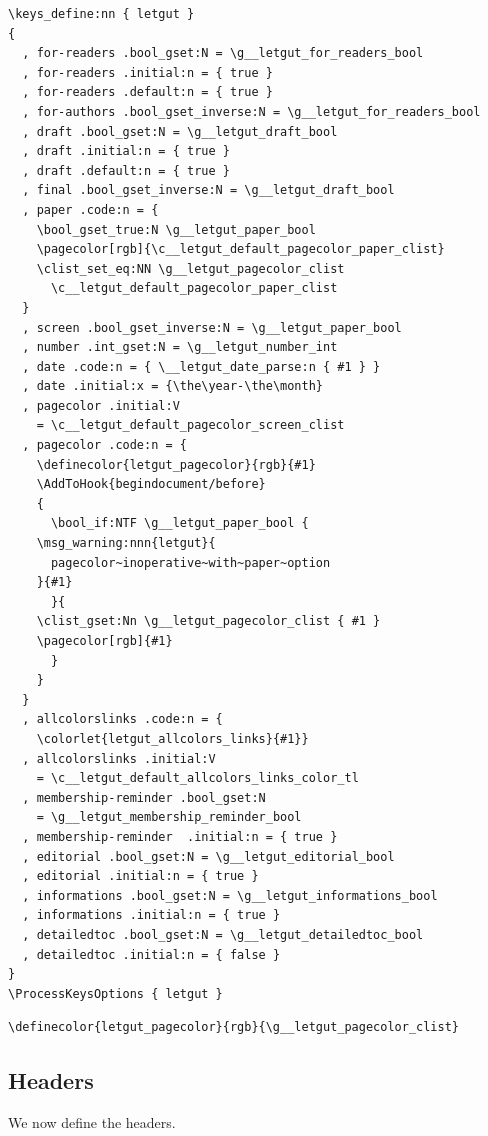 \documentclass{letgut}
\begin{document}
\begin{lstlisting}
\keys_define:nn { letgut }
{
  , for-readers .bool_gset:N = \g__letgut_for_readers_bool
  , for-readers .initial:n = { true }
  , for-readers .default:n = { true }
  , for-authors .bool_gset_inverse:N = \g__letgut_for_readers_bool
  , draft .bool_gset:N = \g__letgut_draft_bool
  , draft .initial:n = { true }
  , draft .default:n = { true }
  , final .bool_gset_inverse:N = \g__letgut_draft_bool
  , paper .code:n = {
    \bool_gset_true:N \g__letgut_paper_bool
    \pagecolor[rgb]{\c__letgut_default_pagecolor_paper_clist}
    \clist_set_eq:NN \g__letgut_pagecolor_clist
      \c__letgut_default_pagecolor_paper_clist
  }
  , screen .bool_gset_inverse:N = \g__letgut_paper_bool
  , number .int_gset:N = \g__letgut_number_int
  , date .code:n = { \__letgut_date_parse:n { #1 } }
  , date .initial:x = {\the\year-\the\month}
  , pagecolor .initial:V
    = \c__letgut_default_pagecolor_screen_clist
  , pagecolor .code:n = {
    \definecolor{letgut_pagecolor}{rgb}{#1}
    \AddToHook{begindocument/before}
    {
      \bool_if:NTF \g__letgut_paper_bool {
	\msg_warning:nnn{letgut}{
	  pagecolor~inoperative~with~paper~option
	}{#1}
      }{
	\clist_gset:Nn \g__letgut_pagecolor_clist { #1 }
	\pagecolor[rgb]{#1}
      }
    }
  }
  , allcolorslinks .code:n = {
    \colorlet{letgut_allcolors_links}{#1}}
  , allcolorslinks .initial:V
    = \c__letgut_default_allcolors_links_color_tl
  , membership-reminder .bool_gset:N
    = \g__letgut_membership_reminder_bool
  , membership-reminder  .initial:n = { true }
  , editorial .bool_gset:N = \g__letgut_editorial_bool
  , editorial .initial:n = { true }
  , informations .bool_gset:N = \g__letgut_informations_bool
  , informations .initial:n = { true }
  , detailedtoc .bool_gset:N = \g__letgut_detailedtoc_bool
  , detailedtoc .initial:n = { false }
}
\ProcessKeysOptions { letgut }
\end{lstlisting}

\begin{lstlisting}
\definecolor{letgut_pagecolor}{rgb}{\g__letgut_pagecolor_clist}
\end{lstlisting}

\subsection{Headers}
\label{sec:org0244c68}

We now define the headers.
\end{document}
